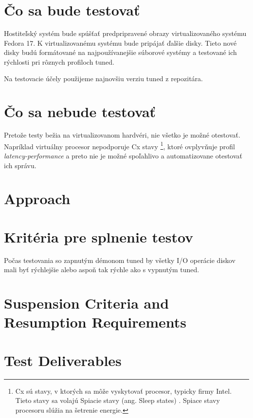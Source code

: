 \section{Čo sa bude testovať}
Hostiteľský systém bude spúšťať predpripravené obrazy virtualizovaného systému
Fedora 17. K virtualizovanému systému bude pripájať ďalšie disky. Tieto nové
disky budú formátované na najpoužívanejšie súborové systémy a testované ich
rýchlosti pri rôznych profiloch tuned.

Na testovacie účely použijeme najnovšiu verziu tuned z repozitára.

\section{Čo sa nebude testovať}
Pretože testy bežia na virtualizovanom hardvéri, nie všetko je možné otestovať.
Napríklad virtuálny procesor nepodporuje Cx stavy \footnote{Cx sú stavy, v
ktorých sa môže vyskytovať procesor, typicky firmy Intel. Tieto stavy sa volajú
Spiacie stavy (ang. Sleep states) \cite{sleepStates}. Spiace stavy procesoru
slúžia na šetrenie energie.}, ktoré ovplyvňuje profil \emph{latency-performance} a
preto nie je možné spoľahlivo a automatizovane otestovať ich správu.

\section{Approach}
\section{Kritéria pre splnenie testov}
Počas testovania so zapnutým démonom tuned by všetky I/O operácie diskov mali
byť rýchlejšie alebo aspoň tak rýchle ako s vypnutým tuned.

\section{Suspension Criteria and Resumption Requirements}
\section{Test Deliverables}

